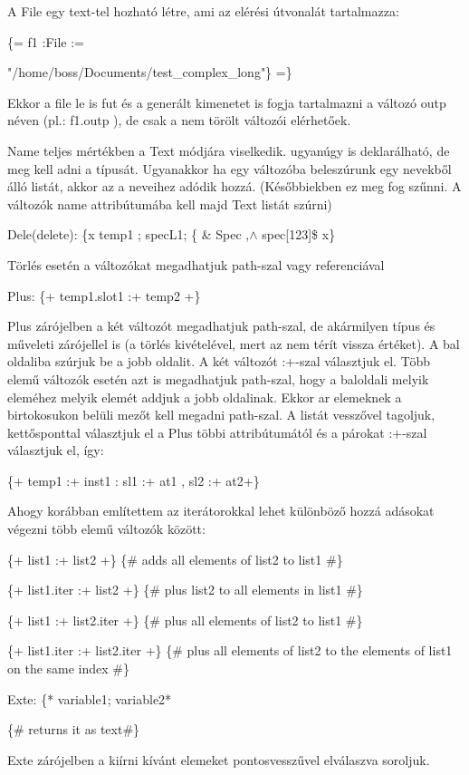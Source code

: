 A File egy text-tel hozható létre, ami az elérési útvonalát tartalmazza:

\{= f1 :File := {"/home/boss/Documents/test\_complex\_long"\} =\}

Ekkor a file le is fut és a generált kimenetet is fogja tartalmazni a változó outp néven (pl.: f1.outp ), de csak a nem törölt változói elérhetőek.

Name teljes mértékben a Text módjára viselkedik. ugyanúgy is deklarálható, de meg kell adni a típusát. Ugyanakkor ha egy változóba beleszúrunk egy nevekből álló listát, akkor az a neveihez adódik hozzá. (Későbbiekben ez meg fog szűnni. A változók name attribútumába kell majd Text listát szúrni)

Dele(delete): \{x temp1 ; specL1; \{ \& Spec ,$\land$ spec[123]\$ x\}

Törlés esetén a változókat megadhatjuk path-szal vagy referenciával

Plus: \{+ temp1.slot1 :+ temp2 +\}

Plus zárójelben a két változót megadhatjuk path-szal, de akármilyen típus és műveleti zárójellel is (a törlés kivételével, mert az nem térít vissza értéket). A bal oldaliba szúrjuk be a jobb oldalit. A két változót :+-szal választjuk el. Több elemű változók esetén azt is megadhatjuk path-szal, hogy a baloldali melyik eleméhez melyik elemét addjuk a jobb oldalinak. Ekkor ar elemeknek a birtokosukon belüli mezőt kell megadni path-szal. A listát vesszővel tagoljuk, kettősponttal választjuk el a Plus többi attribútumától és a párokat :+-szal választjuk el, így:

\{+ temp1 :+ inst1 : sl1 :+ at1 , sl2 :+ at2+\}

Ahogy korábban említettem az iterátorokkal lehet különböző hozzá adásokat végezni több elemű változók között:

\{+ list1 :+ list2 +\} \{\# adds all elements of list2 to list1 \#\}

\{+ list1.iter :+ list2 +\} \{\# plus list2 to all elements in list1 \#\}

\{+ list1 :+ list2.iter +\} \{\# plus all elements of list2 to list1 \#\}

\{+ list1.iter :+ list2.iter +\} \{\# plus all elements of list2 to the elements of list1 on the same index \#\}

Exte: \{* variable1; variable2*} \{\# returns it as text\#\}

Exte zárójelben a kiírni kívánt elemeket pontosvesszűvel elválaszva soroljuk.

